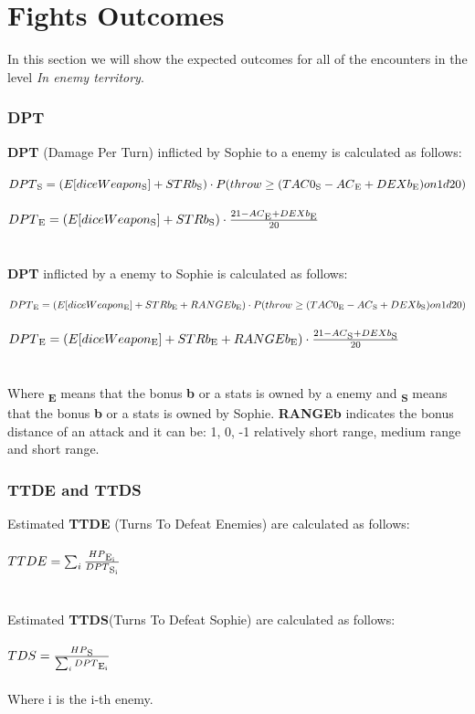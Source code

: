 \section{Fights Outcomes}
In this section we will show the expected outcomes for all of the encounters in the level \textit{In enemy territory}. 
\subsubsection{DPT}
\textbf{DPT} (Damage Per Turn) inflicted by Sophie to a enemy is calculated as follows:\\\\
$DPT\textsubscript{S}=(E[diceWeapon\textsubscript{S}] + STRb\textsubscript{S}) \cdot P(throw \ge (TAC0\textsubscript{S} - AC\textsubscript{E} + DEXb\textsubscript{E}) on 1d20)$\\\\
$DPT\textsubscript{E}=(E[diceWeapon\textsubscript{S}] + STRb\textsubscript{S}) \cdot \frac{21-AC\textsubscript{E} + DEXb\textsubscript{E}}{20}$\\\\\\
\textbf{DPT} inflicted by a enemy to Sophie is calculated as follows:\\\\
$DPT\textsubscript{E}=(E[diceWeapon\textsubscript{E}] + STRb\textsubscript{E} + RANGEb\textsubscript{E}) \cdot P(throw \ge (TAC0\textsubscript{E} - AC\textsubscript{S} + DEXb\textsubscript{S}) on 1d20)$\\\\
$DPT\textsubscript{E}=(E[diceWeapon\textsubscript{E}] + STRb\textsubscript{E} + RANGEb\textsubscript{E}) \cdot \frac{21-AC\textsubscript{S} + DEXb\textsubscript{S}}{20}$\\\\\\

Where \textbf{\textsubscript{E}} means that the bonus \textbf{b} or a stats is owned by a enemy and \textbf{\textsubscript{S}} means that the bonus \textbf{b} or a stats is owned by Sophie. \textbf{RANGEb} indicates the bonus distance of an attack and it can be: 1, 0, -1 relatively short range, medium range and short range.

\subsubsection{TTDE and TTDS}
Estimated \textbf{TTDE} (Turns To Defeat Enemies) are calculated as follows:\\\\
$TTDE=\sum_{i}\frac{HP\textsubscript{E\textsubscript{i}}}{DPT\textsubscript{S\textsubscript{i}}}$\\\\\\
Estimated \textbf{TTDS}(Turns To Defeat Sophie) are calculated as follows:\\\\
$TDS=\frac{HP\textsubscript{S}}{\sum_{i}DPT\textsubscript{E\textsubscript{i}}}$\\\\
Where i is the i-th enemy.\\

